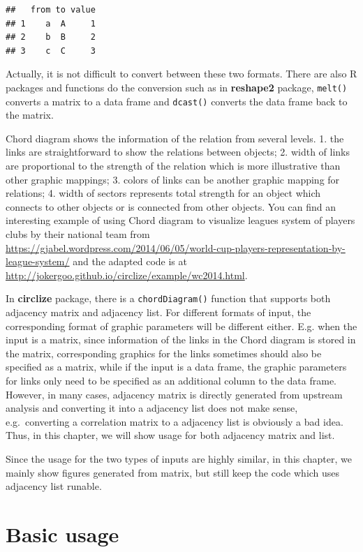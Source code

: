 \documentclass[]{book}
\theoremstyle{definition}
\theoremstyle{definition}
\theoremstyle{remark}
\begin{document}
\begin{verbatim}
##   from to value
## 1    a  A     1
## 2    b  B     2
## 3    c  C     3
\end{verbatim}

Actually, it is not difficult to convert between these two formats.
There are also R packages and functions do the conversion such as in
\textbf{reshape2} package, \texttt{melt()} converts a matrix to a data
frame and \texttt{dcast()} converts the data frame back to the matrix.

Chord diagram shows the information of the relation from several levels.
1. the links are straightforward to show the relations between objects;
2. width of links are proportional to the strength of the relation which
is more illustrative than other graphic mappings; 3. colors of links can
be another graphic mapping for relations; 4. width of sectors represents
total strength for an object which connects to other objects or is
connected from other objects. You can find an interesting example of
using Chord diagram to visualize leagues system of players clubs by
their national team from
\url{https://gjabel.wordpress.com/2014/06/05/world-cup-players-representation-by-league-system/}
and the adapted code is at
\url{http://jokergoo.github.io/circlize/example/wc2014.html}.

In \textbf{circlize} package, there is a \texttt{chordDiagram()}
function that supports both adjacency matrix and adjacency list. For
different formats of input, the corresponding format of graphic
parameters will be different either. E.g. when the input is a matrix,
since information of the links in the Chord diagram is stored in the
matrix, corresponding graphics for the links sometimes should also be
specified as a matrix, while if the input is a data frame, the graphic
parameters for links only need to be specified as an additional column
to the data frame. However, in many cases, adjacency matrix is directly
generated from upstream analysis and converting it into a adjacency list
does not make sense, e.g.~converting a correlation matrix to a adjacency
list is obviously a bad idea. Thus, in this chapter, we will show usage
for both adjacency matrix and list.

Since the usage for the two types of inputs are highly similar, in this
chapter, we mainly show figures generated from matrix, but still keep
the code which uses adjacency list runable.

\section{Basic usage}\label{basic-usage-1}
\end{document}
